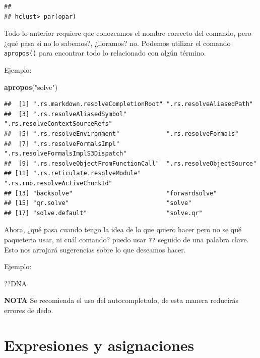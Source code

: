 \documentclass[
]{book}
\newenvironment{Shaded}{\begin{snugshade}}{\end{snugshade}}
\newcommand{\FunctionTok}[1]{\textcolor[rgb]{0.13,0.29,0.53}{\textbf{#1}}}
\newcommand{\NormalTok}[1]{#1}
\newcommand{\StringTok}[1]{\textcolor[rgb]{0.31,0.60,0.02}{#1}}
\begin{document}
\begin{verbatim}
## 
## hclust> par(opar)
\end{verbatim}

Todo lo anterior requiere que conozcamos el nombre correcto del comando, pero ¿qué pasa si no lo sabemos?, ¿lloramos? no.
Podemos utilizar el comando \texttt{apropos()} para encontrar todo lo relacionado con algún término.

Ejemplo:

\begin{Shaded}
\begin{Highlighting}[]
\FunctionTok{apropos}\NormalTok{(}\StringTok{"solve"}\NormalTok{)}
\end{Highlighting}
\end{Shaded}

\begin{verbatim}
##  [1] ".rs.markdown.resolveCompletionRoot" ".rs.resolveAliasedPath"            
##  [3] ".rs.resolveAliasedSymbol"           ".rs.resolveContextSourceRefs"      
##  [5] ".rs.resolveEnvironment"             ".rs.resolveFormals"                
##  [7] ".rs.resolveFormalsImpl"             ".rs.resolveFormalsImplS3Dispatch"  
##  [9] ".rs.resolveObjectFromFunctionCall"  ".rs.resolveObjectSource"           
## [11] ".rs.reticulate.resolveModule"       ".rs.rnb.resolveActiveChunkId"      
## [13] "backsolve"                          "forwardsolve"                      
## [15] "qr.solve"                           "solve"                             
## [17] "solve.default"                      "solve.qr"
\end{verbatim}

Ahora, ¿qué pasa cuando tengo la idea de lo que quiero hacer pero no se qué paqueteria usar, ni cuál comando? puedo usar \texttt{??} seguido de una palabra clave. Esto nos arrojará sugerencias sobre lo que deseamos hacer.

Ejemplo:

\begin{Shaded}
\begin{Highlighting}[]
\NormalTok{??DNA}
\end{Highlighting}
\end{Shaded}

\textbf{NOTA} Se recomienda el uso del autocompletado, de esta manera reducirás errores de dedo.

\hypertarget{expresiones-y-asignaciones}{%
\section{Expresiones y asignaciones}\label{expresiones-y-asignaciones}}
\end{document}
